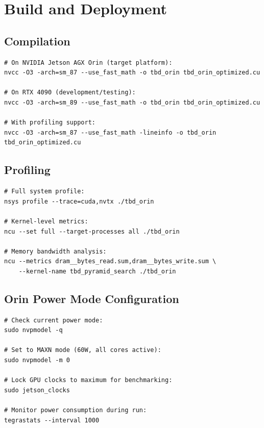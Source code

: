 \documentclass[11pt,letterpaper]{article}
\begin{document}
\section{Build and Deployment}
\label{sec:build}

\subsection{Compilation}

\begin{lstlisting}[style=cuda, numbers=none, caption={Build commands}]
# On NVIDIA Jetson AGX Orin (target platform):
nvcc -O3 -arch=sm_87 --use_fast_math -o tbd_orin tbd_orin_optimized.cu

# On RTX 4090 (development/testing):
nvcc -O3 -arch=sm_89 --use_fast_math -o tbd_orin tbd_orin_optimized.cu

# With profiling support:
nvcc -O3 -arch=sm_87 --use_fast_math -lineinfo -o tbd_orin tbd_orin_optimized.cu
\end{lstlisting}

\subsection{Profiling}

\begin{lstlisting}[style=cuda, numbers=none, caption={Profiling commands on Orin}]
# Full system profile:
nsys profile --trace=cuda,nvtx ./tbd_orin

# Kernel-level metrics:
ncu --set full --target-processes all ./tbd_orin

# Memory bandwidth analysis:
ncu --metrics dram__bytes_read.sum,dram__bytes_write.sum \
    --kernel-name tbd_pyramid_search ./tbd_orin
\end{lstlisting}

\subsection{Orin Power Mode Configuration}

\begin{lstlisting}[style=cuda, numbers=none, caption={Orin power/clock configuration}]
# Check current power mode:
sudo nvpmodel -q

# Set to MAXN mode (60W, all cores active):
sudo nvpmodel -m 0

# Lock GPU clocks to maximum for benchmarking:
sudo jetson_clocks

# Monitor power consumption during run:
tegrastats --interval 1000
\end{lstlisting}
\end{document}
